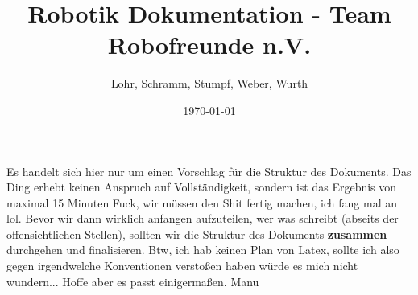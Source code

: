 \documentclass[fontsize=12pt,a4paper,final]{scrartcl}[2003/01/01]
\title{Robotik Dokumentation - Team Robofreunde n.V.}
\author{Lohr, Schramm, Stumpf, Weber, Wurth}
\date{\today}
\begin{document}
Es handelt sich hier nur um einen Vorschlag für die Struktur des Dokuments. Das Ding erhebt keinen Anspruch auf Vollständigkeit, sondern ist das Ergebnis von maximal 15 Minuten \glqq Fuck, wir müssen den Shit fertig machen, ich fang mal an lol\grqq. Bevor wir dann wirklich anfangen aufzuteilen, wer was schreibt (abseits der offensichtlichen Stellen), sollten wir die Struktur des Dokuments \textbf{zusammen} durchgehen und finalisieren. Btw, ich hab keinen Plan von Latex, sollte ich also gegen irgendwelche Konventionen verstoßen haben würde es mich nicht wundern... Hoffe aber es passt einigermaßen. Manu


\maketitle
\tableofcontents
\end{document}
